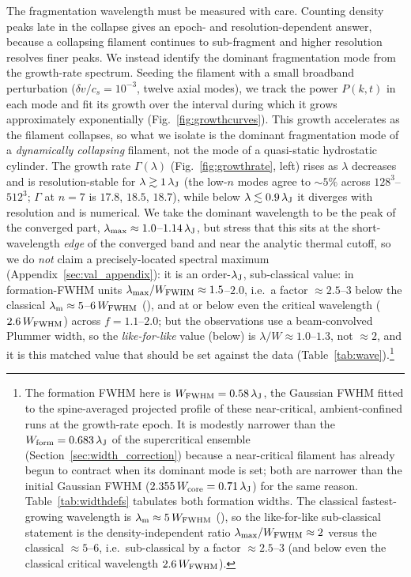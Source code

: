 \documentclass[usenatbib,twoside,twocolumn]{mnras}
\begin{document}
The fragmentation wavelength must be measured with care. Counting density peaks late in the collapse gives an epoch- and resolution-dependent answer, because a collapsing filament continues to sub-fragment and higher resolution resolves finer peaks. We instead identify the dominant fragmentation mode from the growth-rate spectrum. Seeding the filament with a small broadband perturbation ($\delta v/c_s=10^{-3}$, twelve axial modes), we track the power $P(k,t)$ in each mode and fit its growth over the interval during which it grows approximately exponentially (Fig.~\ref{fig:growthcurves}). This growth accelerates as the filament collapses, so what we isolate is the dominant fragmentation mode of a \emph{dynamically collapsing} filament, not the mode of a quasi-static hydrostatic cylinder. The growth rate $\Gamma(\lambda)$ (Fig.~\ref{fig:growthrate}, left) rises as $\lambda$ decreases and is resolution-stable for $\lambda\gtrsim1\,\lambda_{\rm J}$ (the low-$n$ modes agree to $\sim5\%$ across $128^3$--$512^3$; $\Gamma$ at $n=7$ is $17.8$, $18.5$, $18.7$), while below $\lambda\lesssim0.9\,\lambda_{\rm J}$ it diverges with resolution and is numerical. We take the dominant wavelength to be the peak of the converged part, $\lambda_{\rm max}\approx1.0$--$1.14\,\lambda_{\rm J}$, but stress that this sits at the short-wavelength \emph{edge} of the converged band and near the analytic thermal cutoff, so we do \emph{not} claim a precisely-located spectral maximum (Appendix~\ref{sec:val_appendix}): it is an order-$\lambda_{\rm J}$, sub-classical value: in formation-FWHM units $\lambda_{\rm max}/W_{\rm FWHM}\approx1.5$--$2.0$, i.e.\ a factor $\approx2.5$--$3$ below the classical $\lambda_{\rm m}\approx5$--$6\,W_{\rm FWHM}$ (\citealt{Fischera2012}), and at or below even the critical wavelength ($2.6\,W_{\rm FWHM}$) across $f=1.1$--$2.0$; but the observations use a beam-convolved Plummer width, so the \emph{like-for-like} value (below) is $\lambda/W\approx1.0$--$1.3$, not $\approx2$, and it is this matched value that should be set against the data (Table~\ref{tab:wave}).\footnote{The formation FWHM here is $W_{\rm FWHM}=0.58\,\lambda_{\rm J}$, the Gaussian FWHM fitted to the spine-averaged projected profile of these near-critical, ambient-confined runs at the growth-rate epoch. It is modestly narrower than the $W_{\rm form}=0.683\,\lambda_{\rm J}$ of the supercritical ensemble (Section~\ref{sec:width_correction}) because a near-critical filament has already begun to contract when its dominant mode is set; both are narrower than the initial Gaussian FWHM ($2.355\,W_{\rm core}=0.71\,\lambda_{\rm J}$) for the same reason. Table~\ref{tab:widthdefs} tabulates both formation widths. The classical fastest-growing wavelength is $\lambda_{\rm m}\approx5\,W_{\rm FWHM}$ (\citealt{Fischera2012}), so the like-for-like sub-classical statement is the density-independent ratio $\lambda_{\rm max}/W_{\rm FWHM}\approx2$ versus the classical $\approx5$--$6$, i.e.\ sub-classical by a factor $\approx2.5$--$3$ (and below even the classical critical wavelength $2.6\,W_{\rm FWHM}$).}
\end{document}
